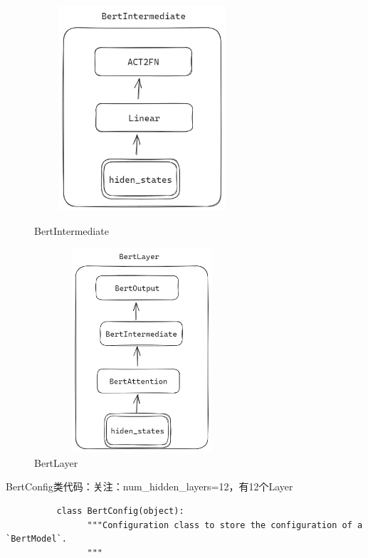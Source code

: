 \documentclass[a4paper]{article}
\begin{document}
\begin{sloppypar}
\begin{figure}[H]
    \end{figure}

    \begin{figure}[H]
        \centering
        \begin{minipage}{0.49\linewidth}
            \centering
            \includegraphics[width=3.15in,height=3.0in]{BertIntermediate}
            \caption{BertIntermediate}
            \label{BertIntermediate}%
        \end{minipage}
        \begin{minipage}{0.49\linewidth}
            \centering
            \includegraphics[width=3.15in,height=3.0in]{BertLayer}
            \caption{BertLayer}
            \label{BertLayer}%
        \end{minipage}

    \end{figure}


    BertConfig类代码：关注：num\_hidden\_layers=12，有12个Layer

    \begin{lstlisting}
          class BertConfig(object):
                """Configuration class to store the configuration of a `BertModel`.
                """
          

\end{lstlisting}
\end{sloppypar}
\end{document}
